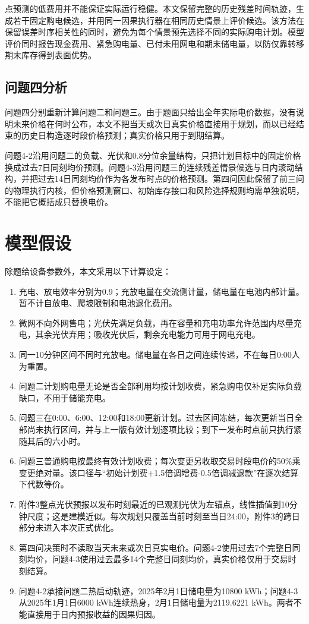 \documentclass[UTF8,a4paper,12pt]{ctexart}
\begin{document}
点预测的低费用并不能保证实际运行稳健。本文保留完整的历史残差时间轨迹，生成若干固定购电候选，并用同一因果执行器在相同历史情景上评价候选。该方法在保留误差时序相关性的同时，避免为每个情景预先选择不同的实际购电计划。模型评价同时报告现金费用、紧急购电量、已付未用网电和期末储电量，以防仅靠转移期末库存得到表面优势。

\subsection{问题四分析}
问题四分别重新计算问题二和问题三。由于题面只给出全年实际电价数据，没有说明未来价格在何时公布，本文不把当天或次日真实价格直接用于规划，而以已经结束的历史日构造逐时段价格预测；真实价格只用于到期结算。

问题4-2沿用问题二的负载、光伏和0.8分位余量结构，只把计划目标中的固定价格换成过去7日同刻均价预测。问题4-3沿用问题三的连续残差情景候选与日内滚动结构，并把过去14日同刻均价作为各发布时点的价格预测。第四问因此保留了前三问的物理执行内核，但价格预测窗口、初始库存接口和风险选择规则均需单独说明，不能把它概括成只替换电价。

\section{模型假设}

除题给设备参数外，本文采用以下计算设定：
\begin{enumerate}[label=(\arabic*),leftmargin=2.8em,itemsep=0.2em]
  \item 充电、放电效率分别为0.9；充放电量在交流侧计量，储电量在电池内部计量。暂不计自放电、爬坡限制和电池退化费用。
  \item 微网不向外网售电；光伏先满足负载，再在容量和充电功率允许范围内尽量充电，其余光伏弃用；吸收光伏后，剩余充电能力可用于网电充电。
  \item 同一10分钟区间不同时充放电。储电量在各日之间连续传递，不在每日0:00人为重置。
  \item 问题二计划购电量无论是否全部利用均按计划收费，紧急购电仅补足实际负载缺口，不用于储能充电。
  \item 问题三在0:00、6:00、12:00和18:00更新计划。过去区间冻结，每次更新当日全部尚未执行区间，并与上一版有效计划逐项比较；到下一发布时点前只执行紧随其后的六小时。
  \item 问题三普通购电按最终有效计划收费；每次变更另收取交易时段电价的50\%乘变更绝对量。该口径与“初始计划费+1.5倍调增费-0.5倍调减退款”在逐次结算下代数等价。
  \item 附件3整点光伏预报以发布时刻最近的已观测光伏为左锚点，线性插值到10分钟尺度；这是建模近似。每次规划只覆盖当前时刻至当日24:00，附件3的跨日部分未进入本次正式优化。
  \item 第四问决策时不读取当天未来或次日真实电价。问题4-2使用过去7个完整日同刻均价，问题4-3使用过去最多14个完整日同刻均价，真实价格仅用于交易时刻结算。
  \item 问题4-2承接问题二热启动轨迹，2025年2月1日储电量为10800 kWh；问题4-3从2025年1月1日6000 kWh连续热身，2月1日储电量为2119.6221 kWh。两者不能直接用于日内预报收益的因果归因。
\end{enumerate}
\end{document}
